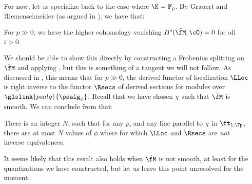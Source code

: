 For now, let us specialize back to the case where $\K=\mathbb{F}_p$.  By  Grauert and Riemenschneider (as argued in \cite[Lemma 2.1]{Kal00}), we have that:
\begin{corollary}\label{cor:cohomology-vanishing}
For $p\gg 0$, we have the higher cohomology vanishing $H^i(\tilde{\fM};\cO)=0$ for all $i>0$.
\end{corollary}
We should be able to show this directly by constructing a Frobenius
splitting on $\tilde{\fM}$ and applying \cite{MR1156382}, but this is
something of a tangent we will not follow.
As discussed in \cite{KalDEQ}, this means that for $p\gg 0$, the
derived functor of localization $\LLoc$ is right inverse to the
functor  $\Rsecs$ of derived sections for modules over $\glslink{psalg}{\psalg_\phi}$.  
Recall that we have chosen $\chi$ such that  $\tilde{\fM}$ is smooth. We can conclude from \cite[Thm. 4.2]{KalDEQ} that:

\begin{lemma}\label{lem:upper-bound}
  There is an integer $N$, such that for any $p$, and any line parallel to $\chi$ in $\ft_{1,\Fp}$, there are at most $N$ values of $\phi$ where for which $\LLoc$ and $\Rsecs$ are {\em not} inverse equivalences.  
\end{lemma}
\begin{remark}
It seems likely that this result also holds when $\tilde{\fM}$ is not smooth, at least for the quantizations we have constructed, but let us leave this point unresolved for the moment.
\end{remark}

